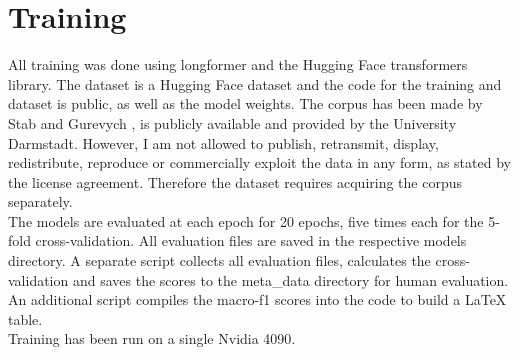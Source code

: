 \documentclass[12]{article}
\theoremstyle{mytheoremstyle}
\theoremstyle{mytheoremstyle}
\theoremstyle{myproblemstyle}
\begin{document}
  \section{Training\dotfill}
  All training was done using longformer\cite{beltagy2020longformer} and the Hugging Face transformers library. The dataset is a Hugging Face dataset and the code for the training and dataset is public, as well as the model weights. The corpus has been made by Stab and Gurevych \cite{stab-gurevych-2017-parsing}, is publicly available and provided by the University Darmstadt. However, I am not allowed to publish, retransmit, display, redistribute, reproduce or commercially exploit the data in any form, as stated by the license agreement. Therefore the dataset requires acquiring the corpus separately.\\
  The models are evaluated at each epoch for 20 epochs, five times each for the 5-fold cross-validation. All evaluation files are saved in the respective models directory. A separate script collects all evaluation files, calculates the cross-validation and saves the scores to the meta\_data directory for human evaluation. An additional script compiles the macro-f1 scores into the code to build a LaTeX table.\\
  Training has been run on a single Nvidia 4090. 
  \newpage
  
  
\end{document}
